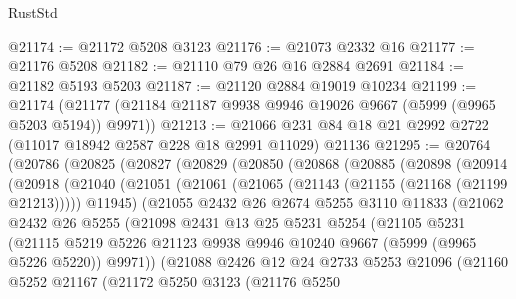 \begin{lexlean}{RustStd}
\begin{coremodule}
@21174 := @21172 @5208 @3123
@21176 := @21073 @2332 @16
@21177 := @21176 @5208
@21182 := @21110 @79 @26 @16 @2884 @2691
@21184 := @21182 @5193 @5203
@21187 := @21120 @2884 @19019 @10234
@21199 := @21174 (@21177 (@21184 @21187 @9938 @9946 @19026 @9667 (@5999 (@9965 @5203 @5194)) @9971))
@21213 := @21066 @231 @84 @18 @21 @2992 @2722 (@11017 @18942 @2587 @228 @18 @2991 @11029) @21136
@21295 := @20764
    (@20786
      (@20825
        (@20827
          (@20829
            (@20850
              (@20868
                (@20885
                  (@20898
                    (@20914
                      (@20918
                        (@21040
                          (@21051
                            (@21061 (@21065 (@21143 (@21155 (@21168 (@21199 @21213))))) @11945)
                            (@21055
                              @2432
                              @26
                              @2674
                              @5255
                              @3110
                              @11833
                              (@21062
                                @2432
                                @26
                                @5255
                                (@21098
                                  @2431
                                  @13
                                  @25
                                  @5231
                                  @5254
                                  (@21105
                                    @5231
                                    (@21115
                                      @5219
                                      @5226
                                      @21123
                                      @9938
                                      @9946
                                      @10240
                                      @9667
                                      (@5999 (@9965 @5226 @5220))
                                      @9971))
                                  (@21088
                                    @2426
                                    @12
                                    @24
                                    @2733
                                    @5253
                                    @21096
                                    (@21160
                                      @5252
                                      @21167
                                      (@21172
                                        @5250
                                        @3123
                                        (@21176
                                          @5250

\end{coremodule}
\end{lexlean}
